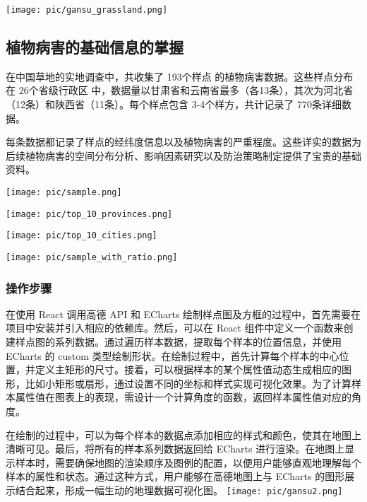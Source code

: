\documentclass{article}
\begin{document}
\texttt{[image: pic/gansu\_grassland.png]} %
\subsection{植物病害的基础信息的掌握}
在中国草地的实地调查中，共收集了 193个样点 的植物病害数据。这些样点分布在 26个省级行政区 中，数据量以甘肃省和云南省最多（各13条），其次为河北省（12条）和陕西省（11条）。每个样点包含 3-4个样方，共计记录了 770条详细数据。

每条数据都记录了样点的经纬度信息以及植物病害的严重程度。这些详实的数据为后续植物病害的空间分布分析、影响因素研究以及防治策略制定提供了宝贵的基础资料。



\par
\texttt{[image: pic/sample.png]} %

\par
\texttt{[image: pic/top\_10\_provinces.png]} %

\par
\texttt{[image: pic/top\_10\_cities.png]} %


\par

\texttt{[image: pic/sample\_with\_ratio.png]} %
\subsubsection{操作步骤}

在使用 React 调用高德 API 和 ECharts 绘制样点图及方框的过程中，首先需要在项目中安装并引入相应的依赖库。然后，可以在 React 组件中定义一个函数来创建样点图的系列数据。通过遍历样本数据，提取每个样本的位置信息，并使用 ECharts 的 custom 类型绘制形状。在绘制过程中，首先计算每个样本的中心位置，并定义主矩形的尺寸。接着，可以根据样本的某个属性值动态生成相应的图形，比如小矩形或扇形，通过设置不同的坐标和样式实现可视化效果。为了计算样本属性值在图表上的表现，需设计一个计算角度的函数，返回样本属性值对应的角度。

在绘制的过程中，可以为每个样本的数据点添加相应的样式和颜色，使其在地图上清晰可见。最后，将所有的样本系列数据返回给 ECharts 进行渲染。在地图上显示样本时，需要确保地图的渲染顺序及图例的配置，以便用户能够直观地理解每个样本的属性和状态。通过这种方式，用户能够在高德地图上与 ECharts 的图形展示结合起来，形成一幅生动的地理数据可视化图。
\texttt{[image: pic/gansu2.png]} %
\end{document}
